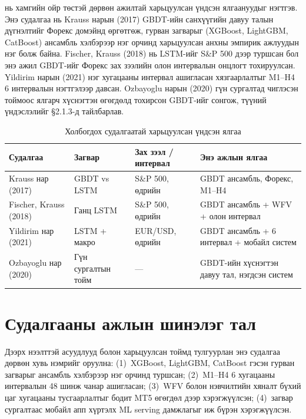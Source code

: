  нь хамгийн ойр төстэй дөрвөн ажилтай харьцуулсан үндсэн ялгаануудыг нэгтгэв. Энэ судалгаа нь Krauss нарын (2017) GBDT-ийн санхүүгийн давуу талын дүгнэлтийг Форекс домэйнд өргөтгөж, гурван загварыг (XGBoost, LightGBM, CatBoost) ансамбль хэлбэрээр нэг орчинд харьцуулсан анхны эмпирик ажлуудын нэг болж байна. Fischer, Krauss (2018) нь LSTM-ийг S\&P 500 дээр туршсан бол энэ ажил GBDT-ийг Форекс зах зээлийн олон интервалын онцлогт тохируулсан. Yildirim нарын (2021) нэг хугацааны интервал ашигласан хязгаарлалтыг M1--H4 6 интервалын нэгтгэлээр давсан. Ozbayoglu нарын (2020) гүн сургалтад чиглэсэн тоймоос ялгарч хүснэгтэн өгөгдөлд тохирсон GBDT-ийг сонгож, түүний үндэслэлийг §2.1.3-д тайлбарлав.

\begin{table}[H]
\centering
\caption{Холбогдох судалгаатай харьцуулсан үндсэн ялгаа}
\label{tab:related_work_comparison}
\renewcommand{\arraystretch}{1.20}
\setlength{\tabcolsep}{4pt}
\begin{tabularx}{\textwidth}{|>{\raggedright\arraybackslash}p{3.0cm}|>{\raggedright\arraybackslash}p{2.5cm}|>{\raggedright\arraybackslash}p{2.4cm}|>{\raggedright\arraybackslash}X|}
\hline
\textbf{Судалгаа} & \textbf{Загвар} & \textbf{Зах зээл / интервал} & \textbf{Энэ ажлын ялгаа} \\ \hline
Krauss нар (2017) & GBDT vs LSTM & S\&P 500, өдрийн & 3 GBDT ансамбль, Форекс, M1--H4 \\ \hline
Fischer, Krauss (2018) & Ганц LSTM & S\&P 500, өдрийн & GBDT ансамбль + WFV + олон интервал \\ \hline
Yildirim нар (2021) & LSTM + макро & EUR/USD, өдрийн & GBDT ансамбль + 6 интервал + мобайл систем \\ \hline
Ozbayoglu нар (2020) & Гүн сургалтын тойм & --- & GBDT-ийн хүснэгтэн давуу тал, нэгдсэн систем \\ \hline
\end{tabularx}
\end{table}

\section{Судалгааны ажлын шинэлэг тал}

Дээрх нээлттэй асуудлууд болон харьцуулсан тоймд тулгуурлан энэ судалгаа дөрвөн хувь нэмрийг оруулна: (1)~XGBoost, LightGBM, CatBoost гэсэн гурван загварыг ансамбль хэлбэрээр нэг орчинд туршсан; (2)~M1--H4 6 хугацааны интервалын 48 шинж чанар ашигласан; (3)~WFV болон нэвчилтийн хяналт бүхий цаг хугацааны тусгаарлалтыг бодит MT5 өгөгдөл дээр хэрэгжүүлсэн; (4)~загвар сургалтаас мобайл апп хүртэлх ML serving дамжлагыг иж бүрэн хэрэгжүүлсэн.
